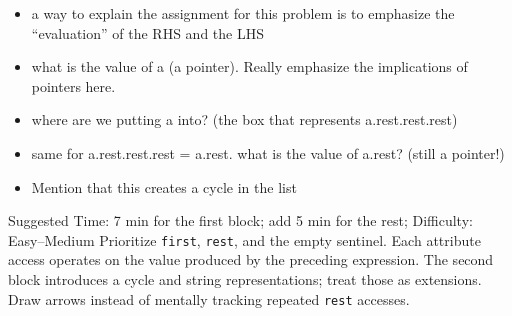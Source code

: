 \begin{guide}
\begin{itemize}
\begin{itemize}
\begin{itemize}
            \item a.rest.rest.rest = a.rest
       \end{itemize}
       \item a way to explain the assignment for this problem is to emphasize the “evaluation” of the RHS and the LHS
       \item what is the value of a (a pointer). Really emphasize the implications of pointers here.        
       \item where are we putting a into? (the box that represents a.rest.rest.rest)
       \item same for a.rest.rest.rest = a.rest. what is the value of a.rest? (still a pointer!)
       \item Mention that this creates a cycle in the list
   \end{itemize}
   \end{itemize}
\end{guide}

\begin{questionmeta}
    Suggested Time: 7 min for the first block; add 5 min for the rest; Difficulty: Easy--Medium
    Prioritize \lstinline{first}, \lstinline{rest}, and the empty sentinel. Each attribute access operates on the value produced by the preceding expression. The second block introduces a cycle and string representations; treat those as extensions. Draw arrows instead of mentally tracking repeated \lstinline{rest} accesses.
\end{questionmeta}
